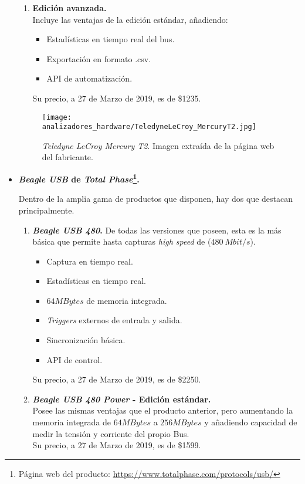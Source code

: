 \begin{itemize}
\begin{enumerate}
        \item \textbf{Edición avanzada.} \\
        Incluye las ventajas de la edición estándar, añadiendo:
        \begin{itemize}
            \item Estadísticas en tiempo real del bus.
            \item Exportación en formato .csv.
            \item API de automatización.
        \end{itemize}
        Su precio, a 27 de Marzo de 2019, es de \$1235.
    \end{enumerate}
    \begin{figure}[htb]
        \centering
        \texttt{[image: analizadores\_hardware/TeledyneLeCroy\_MercuryT2.jpg]}
        \caption{\emph{Teledyne LeCroy Mercury T2}. Imagen extraída de la página web del fabricante.}
        \label{fig:TeledyneLeCroy-MercuryT2}
    \end{figure}

    \item \textbf{\emph{Beagle USB} de \emph{Total Phase}\footnote{Página web del producto: \url{https://www.totalphase.com/protocols/usb/}}.}
    
    Dentro de la amplia gama de productos que disponen, hay dos que destacan principalmente.
    \begin{enumerate}
        \item \textbf{\emph{Beagle USB 480}\cite{totalphase12-2018}.}
        De todas las versiones que poseen, esta es la más básica que permite hasta capturas \emph{high speed} de ($480~Mbit/s$).
        \begin{itemize}
            \item Captura en tiempo real.
            \item Estadísticas en tiempo real.
            \item $64MBytes$ de memoria integrada.
            \item \emph{Triggers} externos de entrada y salida.
            \item Sincronización básica.
            \item API de control.
        \end{itemize}
        Su precio, a 27 de Marzo de 2019, es de \$2250.
        
        \item \textbf{\emph{Beagle USB 480 Power}\cite{totalphase480-2018} - Edición estándar.} \\
        Posee las mismas ventajas que el producto anterior, pero aumentando la memoria integrada de $64MBytes$ a $256MBytes$ y añadiendo capacidad de medir la tensión y corriente del propio Bus.\\
        Su precio, a 27 de Marzo de 2019, es de \$1599.
        

\end{enumerate}
\end{itemize}
